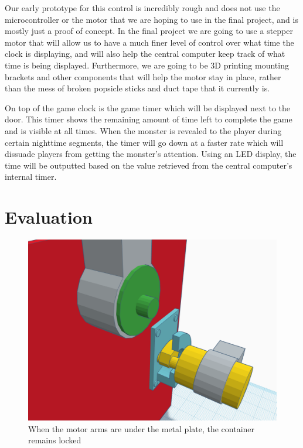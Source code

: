 \documentclass[conference]{IEEEtran}
\begin{document}
Our early prototype for this control is incredibly rough and does not use the microcontroller or the
motor that we are hoping to use in the final project, and is mostly just a proof of concept. In the
final project we are going to use a stepper motor that will allow us to have a much finer level of
control over what time the clock is displaying, and will also help the central computer keep track of
what time is being displayed. Furthermore, we are going to be 3D printing mounting brackets and other
components that will help the motor stay in place, rather than the mess of broken popsicle sticks and
duct tape that it currently is.

On top of the game clock is the game timer which will be displayed next to the door. This timer
shows the remaining amount of time left to complete the game and is visible at all times. When the
monster is revealed to the player during certain nighttime segments, the timer will go down at a
faster rate which will dissuade players from getting the monster's attention. Using an LED display,
the time will be outputted based on the value retrieved from the central computer's internal timer.



\section{Evaluation}


\begin{figure}[H]
    \centering
    \includegraphics[width=0.85\columnwidth]{Images/ClosedLock.png}
    \caption{When the motor arms are under the metal plate, the container remains locked}
\end{figure}
\end{document}
